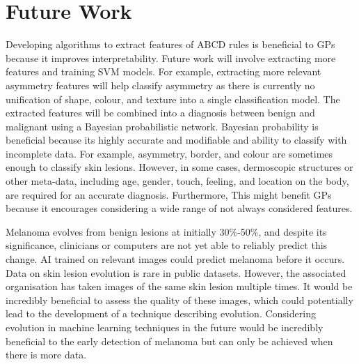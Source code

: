 \chapter{Future Work}
Developing algorithms to extract features of ABCD rules is beneficial to GPs because it improves interpretability. Future work will involve extracting more features and training SVM models. For example, extracting more relevant asymmetry features will help classify asymmetry as there is currently no unification of shape, colour, and texture into a single classification model. The extracted features will be combined into a diagnosis between benign and malignant using a Bayesian probabilistic network. Bayesian probability is beneficial because its highly accurate\cite{Takruri2017} and modifiable and ability to classify with incomplete data. For example, asymmetry, border, and colour are sometimes enough to classify skin lesions. However, in some cases, dermoscopic structures or other meta-data, including age, gender, touch, feeling, and location on the body, are required for an accurate diagnosis. Furthermore, This might benefit GPs because it encourages considering a wide range of not always considered features.

Melanoma evolves from benign lesions at initially 30\%-50\%, and despite its significance, clinicians or computers are not yet able to reliably predict this change. AI trained on relevant images could predict melanoma before it occurs\cite{Sondermann2019}. Data on skin lesion evolution is rare in public datasets. However, the associated organisation has taken images of the same skin lesion multiple times. It would be incredibly beneficial to assess the quality of these images, which could potentially lead to the development of a technique describing evolution. Considering evolution in machine learning techniques in the future would be incredibly beneficial to the early detection of melanoma but can only be achieved when there is more data.